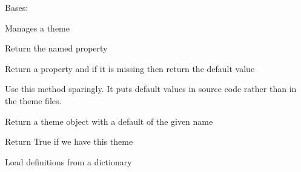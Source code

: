 \documentclass[letterpaper,10pt,english]{sphinxmanual}
\begin{document}
\begin{fulllineitems}
\label{blocks:serge.blocks.themes.Manager}
Bases: 

Manages a theme

\begin{fulllineitems}
\label{blocks:serge.blocks.themes.Manager.getProperty}
Return the named property

\end{fulllineitems}


\begin{fulllineitems}
\label{blocks:serge.blocks.themes.Manager.getPropertyWithDefault}
Return a property and if it is missing then return the default value

Use this method sparingly. It puts default values in source code
rather than in the theme files.

\end{fulllineitems}


\begin{fulllineitems}
\label{blocks:serge.blocks.themes.Manager.getTheme}
Return a theme object with a default of the given name

\end{fulllineitems}


\begin{fulllineitems}
\label{blocks:serge.blocks.themes.Manager.hasTheme}
Return True if we have this theme

\end{fulllineitems}


\begin{fulllineitems}
\label{blocks:serge.blocks.themes.Manager.load}
Load definitions from a dictionary


\end{fulllineitems}
\end{fulllineitems}
\end{document}
